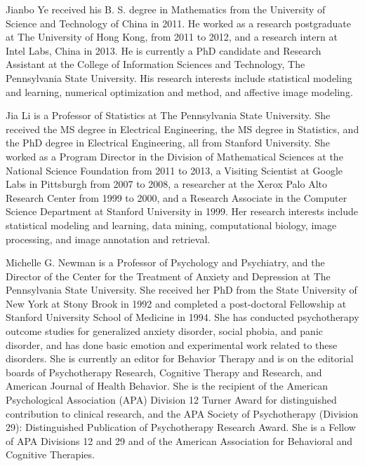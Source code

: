 \documentclass[10pt,journal,letterpaper,compsoc,twoside]{IEEEtran}
\begin{document}


\begin{IEEEbiography}{Jianbo Ye} 
received his B. S. degree in Mathematics from the
University of Science and Technology of China in 2011. 
He worked as a research postgraduate at
The University of Hong Kong, from 2011 to 2012,
and a research intern at Intel Labs, China in 2013. 
He is currently a PhD candidate and Research Assistant at the 
College of Information Sciences and Technology,
The Pennsylvania State University.
His research interests include statistical modeling
and learning, numerical optimization and method, and affective image modeling.
\end{IEEEbiography}

\begin{IEEEbiography}{Jia Li} is a Professor of Statistics at The Pennsylvania State University. She received the MS degree in Electrical Engineering, the MS degree in Statistics, and the PhD degree in Electrical Engineering, all from Stanford University. She worked as a Program Director in the Division of Mathematical Sciences at the National Science Foundation from 2011 to 2013, a Visiting Scientist at Google Labs in Pittsburgh from 2007 to 2008, a researcher at the Xerox Palo Alto Research Center from 1999 to 2000, and a Research Associate in the Computer Science Department at
Stanford University in 1999. Her research interests include statistical modeling and learning, data mining, computational biology, image processing, and image annotation and retrieval.
\end{IEEEbiography}
\vspace{-0.25in}

\begin{IEEEbiography}{Michelle G. Newman}  is a Professor of Psychology and Psychiatry, and the Director of the Center for the Treatment of Anxiety and Depression at The Pennsylvania State University.  She received her PhD from the State University of New York at Stony Brook in 1992 and completed a post-doctoral Fellowship at Stanford University School of Medicine in 1994. She has conducted psychotherapy outcome studies for generalized anxiety disorder, social phobia, and panic disorder, and has done basic emotion and experimental work related to these disorders. She is currently an editor for Behavior Therapy and is on the editorial boards of Psychotherapy Research, Cognitive Therapy and Research, and American Journal of Health Behavior. She is the recipient of the American Psychological Association (APA) Division 12 Turner Award for distinguished contribution to clinical research, and the APA Society of Psychotherapy (Division 29): Distinguished Publication of Psychotherapy Research Award. She is a Fellow of APA Divisions 12 and 29 and of the American Association for Behavioral and Cognitive Therapies.
\end{IEEEbiography}
\vspace{-0.25in}
\end{document}
